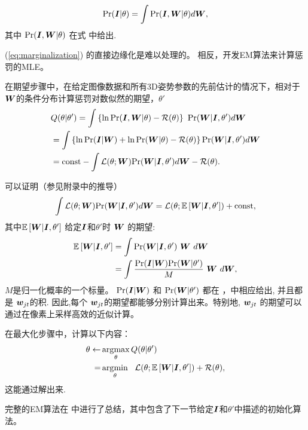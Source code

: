 \begin{align}
\mbox{Pr}({\bm{I}}|\theta) = \int\mbox{Pr}({\bm{I}},{\bm{W}}|\theta)d{\bm{W}}, \label{eq:marginalization}
\end{align}
其中 $\mbox{Pr}({\bm{I}},{\bm{W}}|\theta)$ 在式 中给出.

(\ref{eq:marginalization}) 的直接边缘化是难以处理的。
相反，开发EM算法来计算惩罚的MLE。

在期望步骤中，在给定图像数据和所有3D姿势参数的先前估计的情况下，相对于${\bm{W}}$的条件分布计算惩罚对数似然的期望，$\theta'$
\begin{align}
&Q(\theta|\theta') = \int \left\{\ln\mbox{Pr}({\bm{I}},{\bm{W}}|\theta) - \mathcal{R}(\theta)\right\} ~ \mbox{Pr}({\bm{W}}|{\bm{I}},\theta') d{\bm{W}} \nonumber \\
&= \int \left\{\ln\mbox{Pr}({\bm{I}}|{\bm{W}}) + \ln\mbox{Pr}({\bm{W}}|\theta) - \mathcal{R}(\theta)\right\} \mbox{Pr}({\bm{W}}|{\bm{I}},\theta') d{\bm{W}} \nonumber \\
&= \mbox{const} - \int \mathcal{L}(\theta;{\bm{W}}) \mbox{Pr}({\bm{W}}|{\bm{I}},\theta') d{\bm{W}} - \mathcal{R}(\theta).
\end{align}

可以证明（参见附录中的推导）
\begin{align}\label{eq:der1}
\int \mathcal{L}(\theta;{\bm{W}}) \mbox{Pr}({\bm{W}}|{\bm{I}},\theta') d{\bm{W}} = \mathcal{L}(\theta;\mathbb{E}\left[{\bm{W}}|{\bm{I}},\theta'\right]) + \mbox{const},
\end{align}
其中$\mathbb{E}\left[{\bm{W}}|{\bm{I}},\theta'\right]$ 给定${\bm{I}}$和$\theta'$时 ${\bm{W}}$ 的期望:
\begin{align}\label{eq:der2}
\mathbb{E}\left[{\bm{W}}|{\bm{I}},\theta'\right]
&= \int \mbox{Pr}({\bm{W}}|{\bm{I}},\theta')~ {\bm{W}} ~ d{\bm{W}} \nonumber \\
&= \int \frac{\mbox{Pr}({\bm{I}}|{\bm{W}})\mbox{Pr}({\bm{W}}|\theta')}{M} ~ {\bm{W}} ~ d{\bm{W}},
\end{align}
$M$是归一化概率的一个标量。 
$\mbox{Pr}({\bm{I}}|{\bm{W}})$ 和 $\mbox{Pr}({\bm{W}}|\theta')$ 都在 ，中相应给出, 并且都是 ${\bm{w}}_{jt}$的积. 因此,每个 ${\bm{w}}_{jt}$的期望都能够分别计算出来。特别地,  ${\bm{w}}_{jt}$ 的期望可以通过在像素上采样高效的近似计算。

在最大化步骤中，计算以下内容：
\begin{align}
\theta \leftarrow &\operatorname*{arg\!\max}_{\theta} Q(\theta|\theta') \nonumber \\
= &\operatorname*{arg\!\min}_{\theta} ~~ \mathcal{L}(\theta;\mathbb{E}\left[{\bm{W}}|{\bm{I}},\theta'\right]) + \mathcal{R}(\theta),
\end{align}
这能通过解出来.

完整的EM算法在 中进行了总结，其中包含了下一节给定${\bm{I}}$和$\theta'$中描述的初始化算法。

